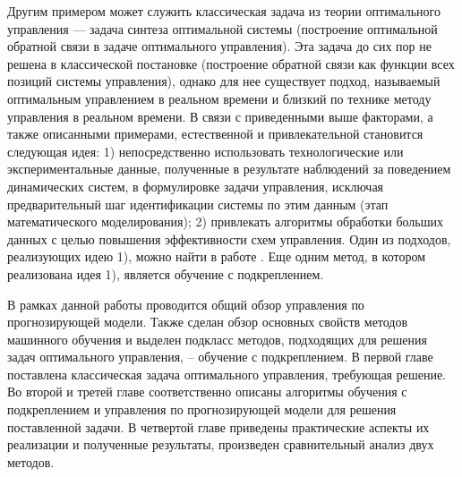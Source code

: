 Другим примером может служить классическая задача из теории оптимального управления --- задача синтеза оптимальной системы \cite{npont} (построение оптимальной обратной связи в задаче оптимального управления). Эта задача до сих пор не решена в классической постановке (построение обратной связи как функции всех позиций системы управления), однако для нее существует подход, называемый оптимальным управлением в реальном времени \cite{ngab} и близкий по технике методу управления в реальном времени. В связи с приведенными выше факторами, а также описанными примерами, естественной и привлекательной становится следующая идея: 1) непосредственно использовать технологические или экспериментальные данные, полученные в результате наблюдений за поведением динамических систем, в формулировке задачи управления, исключая предварительный шаг идентификации системы по этим данным (этап математического моделирования); 2) привлекать алгоритмы обработки больших данных с целью повышения эффективности схем управления. Один из подходов, реализующих идею 1), можно найти в работе \cite{kost}. Еще одним метод, в котором реализована идея 1), является обучение с подкреплением. 

В рамках данной работы проводится общий обзор управления по прогнозирующей модели. Также сделан обзор основных свойств методов машинного обучения и выделен подкласс методов, подходящих для решения задач оптимального управления, -- обучение с подкреплением. В первой главе поставлена классическая задача оптимального управления, требующая решение.  Во второй и третей главе  соответственно описаны алгоритмы обучения с подкреплением и управления по прогнозирующей модели для решения поставленной задачи. В четвертой главе приведены практические аспекты их реализации и полученные результаты, произведен сравнительный анализ двух методов.

